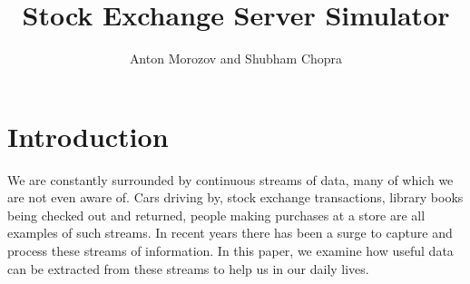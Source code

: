 \documentclass{article}
\begin{document}
    
\title{Stock Exchange Server Simulator}
\author{Anton Morozov and Shubham Chopra}
\maketitle
    
\section{Introduction}



We are constantly surrounded by continuous streams of data, many of which we are not even aware of. Cars driving by, stock exchange transactions, library books being checked out and returned, people making purchases at a store are all examples of such streams. In recent years there has been a surge to capture and process these streams of information. In this paper, we examine how useful data can be extracted from these streams to help us in our daily lives. 
\end{document}
